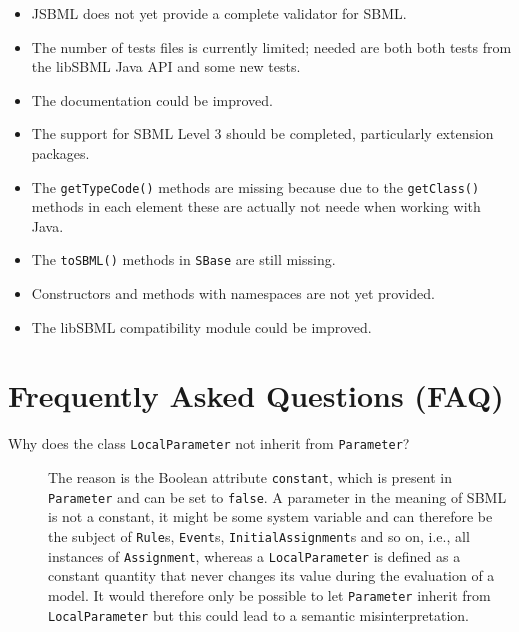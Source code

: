\documentclass[
  BCOR12mm,
  letterpaper,
  11pt,
  headsepline,
  pointlessnumbers,
  tablecaptionabove,
  onelinecaption,
  headinclude,
  appendixprefix,
  idxtotoc,
  bibtotoc,
  twoside,
  titlepage
]{scrartcl}
\begin{document}
\begin{itemize}
\item JSBML does not yet provide a complete validator for SBML.
\item The number of tests files is currently limited; needed are both both tests
from the libSBML Java API and some new tests.
\item The documentation could be improved.
\item The support for SBML Level 3 should be completed, particularly extension packages.
\item The \texttt{getTypeCode()} methods are missing because due to the
\texttt{getClass()} methods in each element these are actually not neede when
working with Java.
\item The \texttt{toSBML()} methods in \texttt{SBase} are still missing.
\item Constructors and methods with namespaces are not yet provided.
\item The libSBML compatibility module could be improved.
\end{itemize}

\appendix

\section{Frequently Asked Questions (FAQ)}

\begin{description}
  \item[Why does the class \texttt{LocalParameter} not inherit from
  \texttt{Parameter}?]
The reason is the Boolean
attribute \texttt{constant}, which is present in
\texttt{Parameter} and can be set to \texttt{false}. A parameter in the meaning
of SBML is not a constant, it might be some system variable and can therefore
be the subject of \texttt{Rule}s,
\texttt{Event}s, \texttt{InitialAssignment}s
and so on, i.e., all instances of \texttt{Assignment}, whereas a
\texttt{LocalParameter} is defined as a constant quantity that never changes its
value during the evaluation of a model. It would therefore only be possible to
let \texttt{Parameter} inherit from \texttt{LocalParameter} but this could lead
to a semantic misinterpretation.
\end{description}
\end{document}
